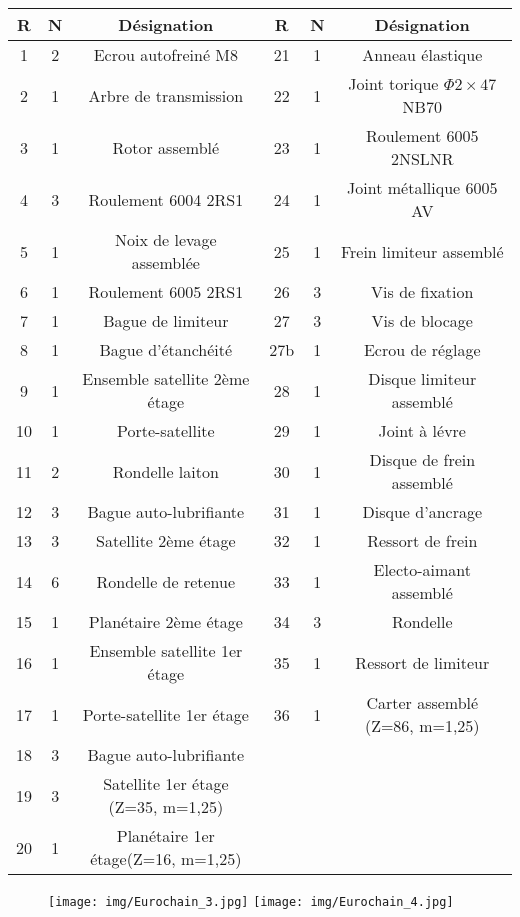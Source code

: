  \begin{tabular}{|c|c|c|c|c|c|}
 \hline
 R & N & Désignation & R & N & Désignation \\
 \hline
 1 & 2 & Ecrou autofreiné M8 & 21 & 1 & Anneau élastique \\
 \hline
 2 & 1 & Arbre de transmission & 22 & 1 & Joint torique $\Phi2\times47$ NB70 \\
 \hline
 3 & 1 & Rotor assemblé & 23 & 1 & Roulement 6005 2NSLNR \\
 \hline
 4 & 3 & Roulement 6004 2RS1 & 24 & 1 & Joint métallique 6005 AV \\
 \hline
 5 & 1 & Noix de levage assemblée & 25 & 1 & Frein limiteur assemblé \\
 \hline
 6 & 1 & Roulement 6005 2RS1 & 26 & 3 & Vis de fixation \\
 \hline
 7 & 1 & Bague de limiteur & 27 & 3 & Vis de blocage \\
 \hline
 8 & 1 & Bague d'étanchéité & 27b & 1 & Ecrou de réglage \\
 \hline
 9 & 1 & Ensemble satellite 2ème étage & 28 & 1 & Disque limiteur assemblé \\
 \hline
 10 & 1 & Porte-satellite & 29 & 1 & Joint à lévre \\
 \hline
 11 & 2 & Rondelle laiton & 30 & 1 & Disque de frein assemblé \\
 \hline
 12 & 3 & Bague auto-lubrifiante & 31 & 1 & Disque d'ancrage \\
 \hline
 13 & 3 & Satellite 2ème étage & 32 & 1 & Ressort de frein \\
 \hline
 14 & 6 & Rondelle de retenue & 33 & 1 & Electo-aimant assemblé \\
 \hline
 15 & 1 & Planétaire 2ème étage & 34 & 3 & Rondelle \\
 \hline
 16 & 1 & Ensemble satellite 1er étage & 35 & 1 & Ressort de limiteur \\
 \hline
 17 & 1 & Porte-satellite 1er étage & 36 & 1 & Carter assemblé (Z=86, m=1,25) \\
 \hline
 18 & 3 & Bague auto-lubrifiante &  &  &  \\
 \hline
 19 & 3 & Satellite 1er étage (Z=35, m=1,25) &  &  &  \\
 \hline
 20 & 1 & Planétaire 1er  étage(Z=16, m=1,25) &  &  &  \\
 \hline
\end{tabular}

\newpage

\begin{figure}[!h]
 \centering\texttt{[image: img/Eurochain\_3.jpg]}
 \centering\texttt{[image: img/Eurochain\_4.jpg]}
\end{figure}

